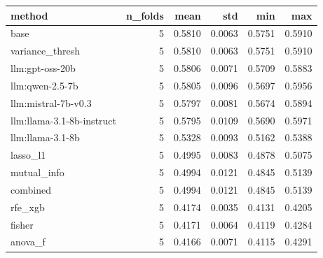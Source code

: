 \begin{tabular}{lrrrrr}
\toprule
method & n_folds & mean & std & min & max \\
\midrule
base & 5 & 0.5810 & 0.0063 & 0.5751 & 0.5910 \\
variance_thresh & 5 & 0.5810 & 0.0063 & 0.5751 & 0.5910 \\
llm:gpt-oss-20b & 5 & 0.5806 & 0.0071 & 0.5709 & 0.5883 \\
llm:qwen-2.5-7b & 5 & 0.5805 & 0.0096 & 0.5697 & 0.5956 \\
llm:mistral-7b-v0.3 & 5 & 0.5797 & 0.0081 & 0.5674 & 0.5894 \\
llm:llama-3.1-8b-instruct & 5 & 0.5795 & 0.0109 & 0.5690 & 0.5971 \\
llm:llama-3.1-8b & 5 & 0.5328 & 0.0093 & 0.5162 & 0.5388 \\
lasso_l1 & 5 & 0.4995 & 0.0083 & 0.4878 & 0.5075 \\
mutual_info & 5 & 0.4994 & 0.0121 & 0.4845 & 0.5139 \\
combined & 5 & 0.4994 & 0.0121 & 0.4845 & 0.5139 \\
rfe_xgb & 5 & 0.4174 & 0.0035 & 0.4131 & 0.4205 \\
fisher & 5 & 0.4171 & 0.0064 & 0.4119 & 0.4284 \\
anova_f & 5 & 0.4166 & 0.0071 & 0.4115 & 0.4291 \\
\bottomrule
\end{tabular}

